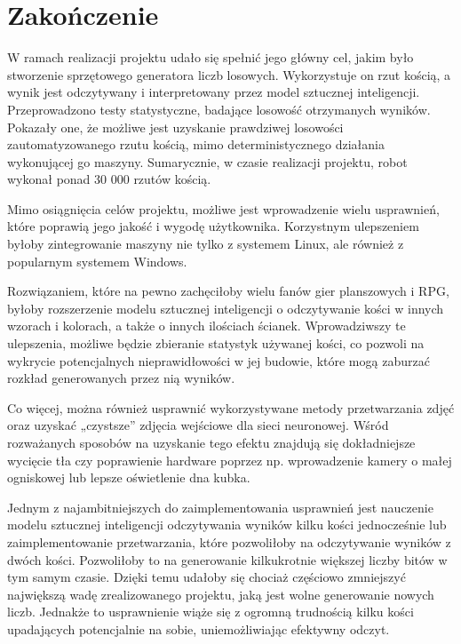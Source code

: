 
\chapter{Zakończenie}\label{ch:zakonczenie}

W ramach realizacji projektu udało się spełnić jego główny cel, jakim było stworzenie sprzętowego generatora liczb losowych.
Wykorzystuje on rzut kością, a wynik jest odczytywany i interpretowany przez model sztucznej inteligencji. Przeprowadzono
testy statystyczne, badające losowość otrzymanych wyników. Pokazały one, że możliwe jest uzyskanie prawdziwej losowości 
zautomatyzowanego rzutu kością, mimo deterministycznego działania wykonującej go maszyny. 
Sumarycznie, w czasie realizacji projektu, robot wykonał ponad 30 000 rzutów kością.

Mimo osiągnięcia celów projektu, możliwe jest wprowadzenie wielu usprawnień, które poprawią jego jakość i wygodę użytkownika.
Korzystnym ulepszeniem byłoby zintegrowanie maszyny nie tylko z systemem Linux, ale również z popularnym systemem Windows.

Rozwiązaniem, które na pewno zachęciłoby wielu fanów gier planszowych i RPG, byłoby rozszerzenie modelu 
sztucznej inteligencji o odczytywanie kości w innych wzorach i kolorach, a także o innych ilościach ścianek.
Wprowadziwszy te ulepszenia, możliwe będzie zbieranie statystyk używanej kości, co pozwoli na wykrycie
potencjalnych nieprawidłowości w jej budowie, które mogą zaburzać rozkład generowanych przez nią wyników.

Co więcej, można również usprawnić wykorzystywane metody przetwarzania zdjęć oraz uzyskać
„czystsze” zdjęcia wejściowe dla sieci neuronowej. Wśród rozważanych sposobów na uzyskanie tego efektu znajdują się
dokładniejsze wycięcie tła czy poprawienie hardware poprzez np. wprowadzenie kamery o małej ogniskowej lub
lepsze oświetlenie dna kubka.

Jednym z najambitniejszych do zaimplementowania usprawnień jest nauczenie modelu sztucznej inteligencji odczytywania
wyników kilku kości jednocześnie lub zaimplementowanie przetwarzania, które pozwoliłoby na odczytywanie wyników z dwóch kości.
Pozwoliłoby to na generowanie kilkukrotnie większej liczby bitów w tym samym czasie.
Dzięki temu udałoby się chociaż częściowo zmniejszyć największą wadę zrealizowanego projektu,
jaką jest wolne generowanie nowych liczb.
Jednakże to usprawnienie wiąże się z ogromną trudnością kilku kości upadających potencjalnie na sobie, uniemożliwiając efektywny odczyt.

